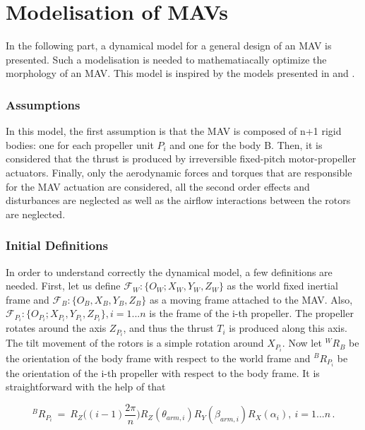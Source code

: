 \section{Modelisation of MAVs}
\label{sec:modeling_mav}
In the following part, a dynamical model for a general design of an MAV is presented.
Such a modelisation is needed to mathematiacally optimize the morphology of
an MAV. This model is inspired by the models presented in
\citep{kamel_voliro:_2018} and \citep{ryll_modeling_2012}.

\subsubsection{Assumptions}
\label{sec:assumptions}
In this model, the first assumption is that the MAV is composed of n+1 rigid bodies:
one for each propeller unit $P_i$ and one for the body B. Then, it is considered that
the thrust is produced by irreversible fixed-pitch motor-propeller actuators. Finally,
only the aerodynamic forces and torques that are responsible for the MAV actuation
are considered, all the second order effects and disturbances are neglected as well as
the airflow interactions between the rotors are neglected.

\subsubsection{Initial Definitions}
\label{sec:definitions}
In order to understand correctly the dynamical model, a few definitions are
needed. First, let us define $\mathcal{F}_{W} : \{O_{W}; X_{W},  Y_{W},  Z_{W}\}$
as the world fixed inertial frame and $\mathcal{F}_{B}: \{O_{B}, X_{B},  Y_{B},
Z_{B}\}$
as a moving frame attached to the MAV. Also, $\mathcal{F}_{P_{i}} : \{O_{P_{i}};
X_{P_{i}}, Y_{P_{i}},  Z_{P_{i}}\}, i = 1...n$ is the frame of the i-th propeller.
The propeller rotates around the axis $Z_{P_{i}}$, and thus the thrust $T_{i}$ is
produced along this axis. The tilt movement of the rotors is a simple rotation
around $X_{P_{i}}$. Now let $^{W}R_{B}$ be the orientation of the body frame
with respect to the world frame and $^{B}R_{P_{i}}$ be the orientation of the
i-th propeller with respect to the body frame. It is
straightforward with the help of  that

\begin{equation}
  \label{rot_b_pi}
  ^{B}R_{P_{i}} \ = \ R_{Z}\bigg((i-1)\frac{2\pi}{n}\bigg) R_Z(\theta_{arm,i})
  R_Y(\beta_{arm,i}) R_{X}(\alpha_{i}),\  i = 1...n\, .
\end{equation}

